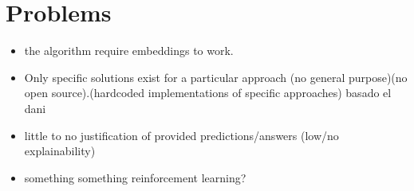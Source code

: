 

\section{Problems}\label{sec:moti-problems}
\begin{itemize}
    \item the algorithm require embeddings to work.
    \item Only specific solutions exist for a particular approach (no general purpose)(no open source).(hardcoded implementations of specific approaches) basado el dani
    \item little to no justification of provided predictions/answers (low/no explainability)
    \item something something reinforcement learning?
\end{itemize}

